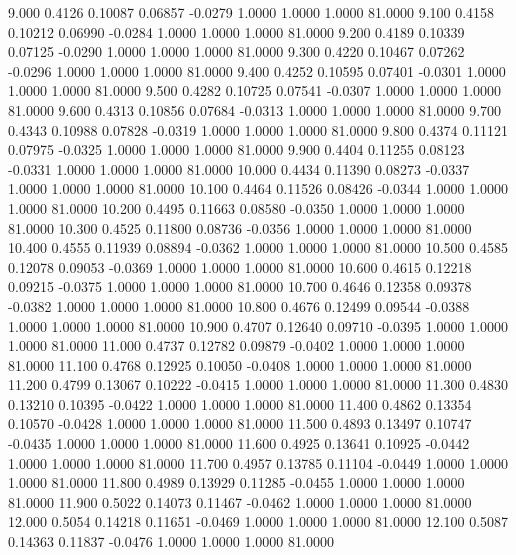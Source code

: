    9.000   0.4126   0.10087   0.06857  -0.0279   1.0000   1.0000   1.0000  81.0000
   9.100   0.4158   0.10212   0.06990  -0.0284   1.0000   1.0000   1.0000  81.0000
   9.200   0.4189   0.10339   0.07125  -0.0290   1.0000   1.0000   1.0000  81.0000
   9.300   0.4220   0.10467   0.07262  -0.0296   1.0000   1.0000   1.0000  81.0000
   9.400   0.4252   0.10595   0.07401  -0.0301   1.0000   1.0000   1.0000  81.0000
   9.500   0.4282   0.10725   0.07541  -0.0307   1.0000   1.0000   1.0000  81.0000
   9.600   0.4313   0.10856   0.07684  -0.0313   1.0000   1.0000   1.0000  81.0000
   9.700   0.4343   0.10988   0.07828  -0.0319   1.0000   1.0000   1.0000  81.0000
   9.800   0.4374   0.11121   0.07975  -0.0325   1.0000   1.0000   1.0000  81.0000
   9.900   0.4404   0.11255   0.08123  -0.0331   1.0000   1.0000   1.0000  81.0000
  10.000   0.4434   0.11390   0.08273  -0.0337   1.0000   1.0000   1.0000  81.0000
  10.100   0.4464   0.11526   0.08426  -0.0344   1.0000   1.0000   1.0000  81.0000
  10.200   0.4495   0.11663   0.08580  -0.0350   1.0000   1.0000   1.0000  81.0000
  10.300   0.4525   0.11800   0.08736  -0.0356   1.0000   1.0000   1.0000  81.0000
  10.400   0.4555   0.11939   0.08894  -0.0362   1.0000   1.0000   1.0000  81.0000
  10.500   0.4585   0.12078   0.09053  -0.0369   1.0000   1.0000   1.0000  81.0000
  10.600   0.4615   0.12218   0.09215  -0.0375   1.0000   1.0000   1.0000  81.0000
  10.700   0.4646   0.12358   0.09378  -0.0382   1.0000   1.0000   1.0000  81.0000
  10.800   0.4676   0.12499   0.09544  -0.0388   1.0000   1.0000   1.0000  81.0000
  10.900   0.4707   0.12640   0.09710  -0.0395   1.0000   1.0000   1.0000  81.0000
  11.000   0.4737   0.12782   0.09879  -0.0402   1.0000   1.0000   1.0000  81.0000
  11.100   0.4768   0.12925   0.10050  -0.0408   1.0000   1.0000   1.0000  81.0000
  11.200   0.4799   0.13067   0.10222  -0.0415   1.0000   1.0000   1.0000  81.0000
  11.300   0.4830   0.13210   0.10395  -0.0422   1.0000   1.0000   1.0000  81.0000
  11.400   0.4862   0.13354   0.10570  -0.0428   1.0000   1.0000   1.0000  81.0000
  11.500   0.4893   0.13497   0.10747  -0.0435   1.0000   1.0000   1.0000  81.0000
  11.600   0.4925   0.13641   0.10925  -0.0442   1.0000   1.0000   1.0000  81.0000
  11.700   0.4957   0.13785   0.11104  -0.0449   1.0000   1.0000   1.0000  81.0000
  11.800   0.4989   0.13929   0.11285  -0.0455   1.0000   1.0000   1.0000  81.0000
  11.900   0.5022   0.14073   0.11467  -0.0462   1.0000   1.0000   1.0000  81.0000
  12.000   0.5054   0.14218   0.11651  -0.0469   1.0000   1.0000   1.0000  81.0000
  12.100   0.5087   0.14363   0.11837  -0.0476   1.0000   1.0000   1.0000  81.0000
